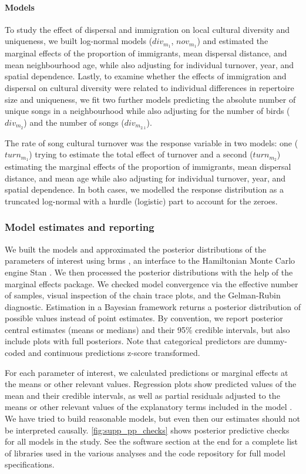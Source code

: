 \paragraph{Models}

To study the effect of dispersal and immigration on local cultural diversity and uniqueness, we built log-normal models ($div_{m_1}$, $nov_{m_1}$) and estimated the marginal effects of the proportion of immigrants, mean dispersal distance, and mean neighbourhood age, while also adjusting for individual turnover, year, and spatial dependence. Lastly, to examine whether the effects of immigration and dispersal on cultural diversity were related to individual differences in repertoire size and uniqueness, we fit two further models predicting the absolute number of unique songs in a neighbourhood while also adjusting for the number of birds ($div_{m_2}$) and the number of songs ($div_{m_{2.1}}$).

The rate of song cultural turnover was the response variable in two models: one ($turn_{m_1}$) trying to estimate the total effect of turnover and a second ($turn_{m_2}$) estimating the marginal effects of the proportion of immigrants, mean dispersal distance, and mean age while also adjusting for individual turnover, year, and spatial dependence. In both cases, we modelled the response distribution as a truncated log-normal with a hurdle (logistic) part to account for the zeroes. 

\subsubsection{Model estimates and reporting}

We built the models and approximated the posterior distributions of the parameters of interest using brms \autocite{brms2017}, an interface to the Hamiltonian Monte Carlo engine Stan \autocite{stan2023}. We then processed the posterior distributions with the help of the marginal effects package. We checked model convergence via the effective number of samples, visual inspection of the chain trace plots, and the Gelman-Rubin diagnostic. Estimation in a Bayesian framework returns a posterior distribution of possible values instead of point estimates. By convention, we report posterior central estimates (means or medians) and their 95\% credible intervals, but also include plots with full posteriors. Note that categorical predictors are dummy-coded and continuous predictions z-score transformed.

For each parameter of interest, we calculated predictions or marginal effects at the means or other relevant values.  Regression plots show predicted values of the mean and their credible intervals, as well as partial residuals adjusted to the means or other relevant values of the explanatory terms included in the model \autocite{fox2018, larsen1972}. We have tried to build reasonable models, but even then our estimates should not be interpreted causally. \autoref{fig:supp_pp_checks} shows posterior predictive checks for all models in the study. See the software section at the end for a complete list of libraries used in the various analyses and the code repository for full model specifications.

